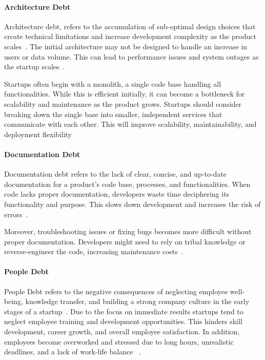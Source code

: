 \paragraph{Architecture Debt}
Architecture debt, refers to the accumulation of sub-optimal design choices that create technical limitations and increase development complexity as the product scales~\cite{Startups4:online}.
The initial architecture may not be designed to handle an increase in users or data volume.
This can lead to performance issues and system outages as the startup scales~\cite{Qualityv77:online,Creating18:online}.

Startups often begin with a monolith, a single code base handling all functionalities.
While this is efficient initially, it can become a bottleneck for scalability and maintenance as the product grows.
Startups should consider breaking down the single base into smaller, independent services that communicate with each other.
This will improve scalability, maintainability, and deployment flexibility~\cite{Howtohan98:online, DesignSt86:online}

\paragraph{Documentation Debt}
Documentation debt refers to the lack of clear, concise, and up-to-date documentation for a product's code base, processes, and functionalities.
When code lacks proper documentation, developers waste time deciphering its functionality and purpose.
This slows down development and increases the risk of errors~\cite{The3Best94:online, 10.1145/3493244.3493254}.

Moreover, troubleshooting issues or fixing bugs becomes more difficult without proper documentation.
Developers might need to rely on tribal knowledge or reverse-engineer the code, increasing maintenance costs~\cite{DesignSt86:online}.

\paragraph{People Debt}
People Debt refers to the negative consequences of neglecting employee well-being, knowledge transfer, and building a strong company culture in the early stages of a startup~\cite{Blog21:online}. Due to the focus on immediate results startups tend to neglect employee training and development opportunities. This hinders skill development, career growth, and overall employee satisfaction. In addition, employees become overworked and stressed due to long hours, unrealistic deadlines, and a lack of work-life balance ~\cite{Besker2018}.


